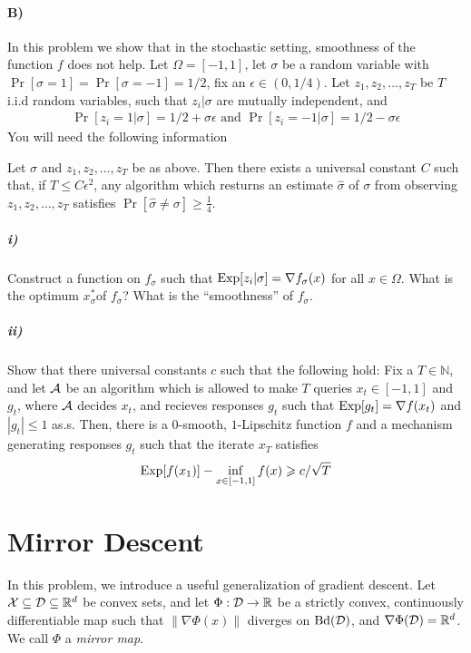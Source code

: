 \documentclass[12pt]{article}
\begin{document}
\paragraph{B)}In this problem we show that in the stochastic setting, smoothness of the function $f$ does not help. Let $\Omega = [-1,1]$, let $\sigma$ be a random variable with $\Pr[\sigma = 1] = \Pr[\sigma = -1] = 1/2$, fix an $\epsilon \in (0,1/4)$. Let $z_1,z_2,\dots,z_T$ be $T$ i.i.d random variables, such that $z_i | \sigma$ are mutually independent, and 
\begin{eqnarray}
\Pr[z_i =  1 | \sigma] = 1/2 + \sigma \epsilon \text{ and } \Pr[z_i =  -1 | \sigma] = 1/2 - \sigma \epsilon 
\end{eqnarray}
You will need the following information
\begin{lemma*} Let $\sigma$ and $z_1,z_2,\dots,z_T$ be as above. Then there exists a universal constant $C$ such that, if $T \le C \epsilon^2$, any algorithm which resturns an estimate $\widehat{\sigma}$ of $\sigma$ from observing $z_1,z_2,\dots,z_T$ satisfies $\Pr[\widehat{\sigma} \ne \sigma] \ge \frac{1}{4}$. 
\end{lemma*}
\subparagraph{i)} Construct a function on $f_{\sigma}$ such that $\mathrm{Exp}[z_i | \sigma] = \nabla f_{\sigma}(x)$ for all $x \in \Omega$. What is the optimum $x^*_{\sigma} $of $f_{\sigma}$? What is the ``smoothness'' of $f_{\sigma}$.
\subparagraph{ii)} Show that there universal constants $c$ such that the following hold: Fix a $T \in \mathbb{N}$, and let ${\cal A}$ be an algorithm which is allowed to make $T$ queries $x_t \in [-1,1]$ and $g_t$, where ${\cal A}$ decides $x_t$, and recieves responses $g_t$ such that $\mathrm{Exp}[g_t] = \nabla f(x_t)$ and $|g_t| \le 1$ as.s. Then, there is a $0$-smooth, $1$-Lipschitz function $f$ and a mechanism generating responses $g_t$ such that the iterate $x_{T}$ satisfies
\begin{eqnarray}
\mathrm{Exp}[f(x_{1})] - \inf_{x \in [-1,1]} f(x)\geqslant c /\sqrt{T}
\end{eqnarray}
\section*{Mirror Descent}
In this problem, we introduce a useful generalization of gradient descent. Let ${\cal X} \subseteq {\cal D} \subseteq \mathbb{R}^d$ be convex sets, and let $\Phi: {\cal D} \to \mathbb{R}$ be a strictly convex, continuously differentiable map such that $\|\nabla \Phi(x)\|$ diverges on $\mathrm{Bd}({\cal D})$, and $\nabla \Phi({\cal D}) = \mathbb{R}^d$. We call $\Phi$ a \emph{mirror map}.
\end{document}
